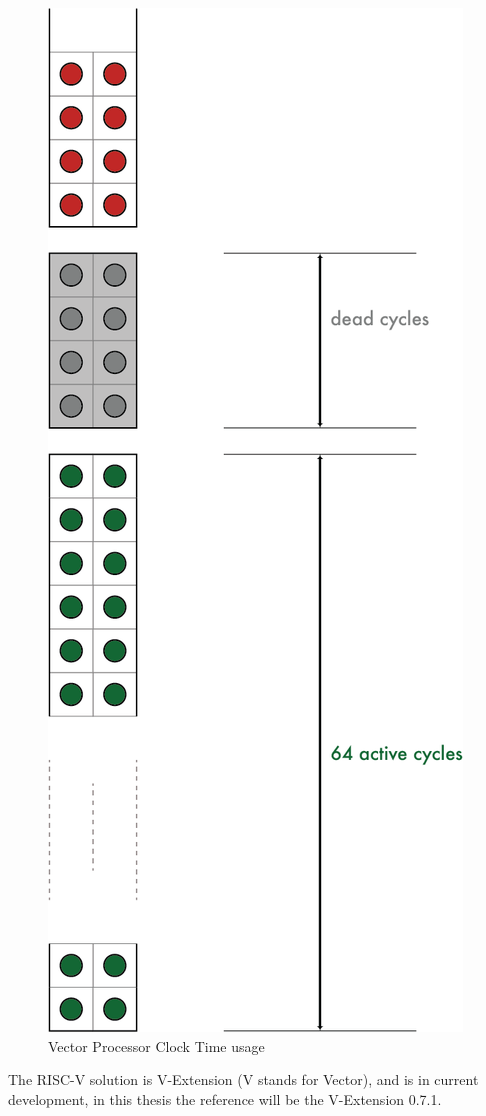 \begin{figure}[H]
    \centering
    \includegraphics[scale = 0.4]{Chapter_1/img/time-usage.png}
    \caption{Vector Processor Clock Time usage \cite{L15-Krste}}
    \label{Vectoring}
\end{figure}
The RISC-V solution is V-Extension (V stands for Vector), and is in current development, in this thesis the reference will be the V-Extension 0.7.1.

